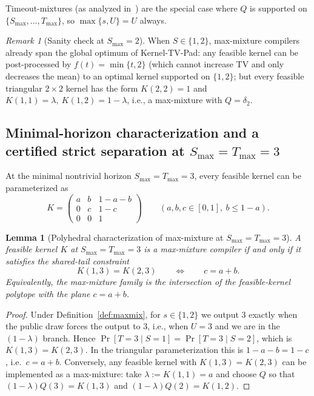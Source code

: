 \documentclass[11pt]{article}
\newtheorem{lemma}[theorem]{Lemma}
\theoremstyle{remark}
\newtheorem{remark}[theorem]{Remark}
\begin{document}
Timeout-mixtures (as analyzed in~\cite{sched}) are the special case where $Q$ is supported on $\{S_{\max},\dots,T_{\max}\}$, so $\max\{s,U\}=U$ always.

\begin{remark}[Sanity check at $S_{\max}=2$]
When $S\in\{1,2\}$, max-mixture compilers already span the global optimum of Kernel-TV-Pad: any feasible kernel can be post-processed by
$f(t)=\min\{t,2\}$ (which cannot increase TV and only decreases the mean) to an optimal kernel supported on $\{1,2\}$; but every feasible triangular
$2\times2$ kernel has the form $K(2,2)=1$ and $K(1,1)=\lambda,\ K(1,2)=1-\lambda$, i.e., a max-mixture with $Q=\delta_2$.
\end{remark}

\subsection{Minimal-horizon characterization and a certified strict separation at $S_{\max}=T_{\max}=3$}
At the minimal nontrivial horizon $S_{\max}=T_{\max}=3$, every feasible kernel can be parameterized as
\[
K=\begin{pmatrix}
 a & b & 1-a-b\\
 0 & c & 1-c\\
 0 & 0 & 1
\end{pmatrix}
\qquad (a,b,c\in[0,1],\ b\le 1-a).
\]

\begin{lemma}[Polyhedral characterization of max-mixture at $S_{\max}=T_{\max}=3$]\label{lem:maxmix3}
A feasible kernel $K$ at $S_{\max}=T_{\max}=3$ is a max-mixture compiler if and only if it satisfies the shared-tail constraint
\[
K(1,3)=K(2,3)\qquad\Longleftrightarrow\qquad c=a+b.
\]
Equivalently, the max-mixture family is the intersection of the feasible-kernel polytope with the plane $c=a+b$.
\end{lemma}

\begin{proof}
Under Definition~\ref{def:maxmix}, for $s\in\{1,2\}$ we output $3$ exactly when the public draw forces the output to $3$,
i.e., when $U=3$ and we are in the $(1-\lambda)$ branch. Hence $\Pr[T=3\mid S=1]=\Pr[T=3\mid S=2]$, which is $K(1,3)=K(2,3)$.
In the triangular parameterization this is $1-a-b=1-c$, i.e.\ $c=a+b$.
Conversely, any feasible kernel with $K(1,3)=K(2,3)$ can be implemented as a max-mixture:
take $\lambda:=K(1,1)=a$ and choose $Q$ so that $(1-\lambda)Q(3)=K(1,3)$ and $(1-\lambda)Q(2)=K(1,2)$.
\end{proof}
\end{document}
